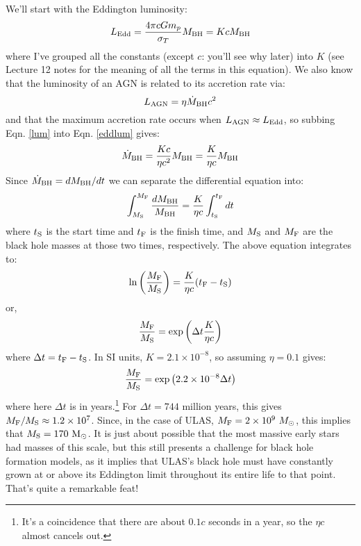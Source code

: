 \documentclass[11pt]{article}
\begin{document}
We'll start with the Eddington luminosity:
\begin{equation}
\label{eddlum}
L_{\rm Edd}=\frac{4\pi c G m_p}{\sigma_T}M_{\rm BH} = KcM_{\rm BH}
\end{equation}
where I've grouped all the constants (except $c$: you'll see why
later) into $K$ (see Lecture 12 notes for the meaning of all the terms
in this equation). We also know that the luminosity of an AGN is
related to its accretion rate via:
\begin{equation}
\label{lum}
L_{\rm AGN} = \eta \dot{M}_{\rm BH}c^2 
\end{equation}
and that the maximum accretion rate occurs when $L_{\rm AGN}\approx
L_{\rm Edd}$, so subbing Eqn. \ref{lum} into Eqn. \ref{eddlum} gives:
\begin{equation}
\dot{M}_{\rm BH} = \frac{Kc}{\eta c^2}M_{\rm BH} = \frac{K}{\eta c}M_{\rm BH}
\end{equation}
Since $\dot{M}_{\rm BH}=dM_{\rm BH}/dt$ we can separate the
differential equation into:
\begin{equation}
\int_{M_{\rm S}}^{M_{\rm F}}{\frac{dM_{\rm BH}}{M_{\rm BH}}} =
{\frac{K}{\eta c}}\int_{t_{\rm S}}^{t_{\rm F}}{dt}
\end{equation}
where $t_{\rm S}$ is the start time and $t_{\rm F}$ is the finish
time, and $M_{\rm S}$ and $M_{\rm F}$ are the black hole masses at
those two times, respectively. The above equation integrates to:
\begin{equation}
{\rm ln}\left(\frac{M_{\rm F}}{M_{\rm S}}\right) = \frac{K}{\eta c}(t_{\rm
  F} - t_{\rm S})
\end{equation}
or, 
\begin{equation}
\frac{M_{\rm F}}{M_{\rm S}} = {\rm exp}\left(\Delta t\frac{K}{\eta c}\right)
\end{equation}
where $\Delta t = t_{\rm F} - t_{\rm S}$. In SI units,
$K=2.1\times10^{-8}$, so assuming $\eta=0.1$ gives:
\begin{equation}
\frac{M_{\rm F}}{M_{\rm S}} = {\rm exp}\left(2.2\times10^{-8}\Delta t\right)
\end{equation}
where here $\Delta t$ is in years.\footnote{It's a coincidence that there
  are about $0.1c$ seconds in a year, so the $\eta c$ almost cancels
  out.} For $\Delta t=744$ million years, this gives
$M_{\rm F}/M_{\rm S}\approx1.2\times10^7$. Since, in the case of ULAS,
$M_{\rm F}=2\times10^9~M_\odot$, this implies that
$M_{\rm S}=170~{\rm M_\odot}$. It is just about possible that the most
massive early stars had masses of this scale, but this still presents
a challenge for black hole formation models, as it implies that ULAS's
black hole must have constantly grown at or above its Eddington limit
throughout its entire life to that point. That's quite a remarkable
feat!
\end{document}
